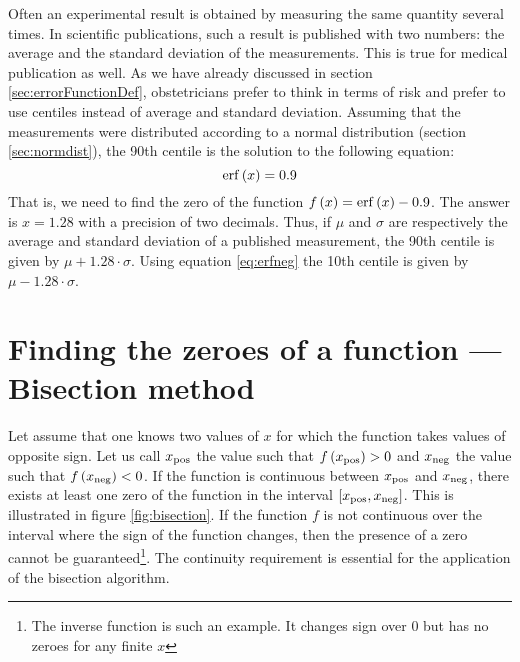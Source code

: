 \documentclass[twoside]{book}
\begin{document}
Often an experimental result is obtained by measuring the same
quantity several times. In scientific publications, such a result
is published with two numbers: the average and the standard
deviation of the measurements. This is true for medical
publication as well. As we have already discussed in section
\ref{sec:errorFunctionDef}, obstetricians prefer to think in terms
of risk and prefer to use centiles instead of average and standard
deviation. Assuming that the measurements were distributed
according to a normal distribution (\cf section
\ref{sec:normdist}), the 90th centile is the solution to the
following equation:
\begin{equation}
\label{eq:centile90}
  \mathop{\rm erf}\left(x\right)=0.9
\end{equation}
That is, we need to find the zero of the function
$f\left(x\right)=\mathop{\rm erf}\left(x\right)-0.9$. The answer is $x=1.28$
with a precision of two decimals. Thus, if $\mu$ and $\sigma$ are
respectively the average and standard deviation of a published
measurement, the 90th centile is given by $\mu+1.28\cdot\sigma$.
Using equation \ref{eq:erfneg} the 10th centile is given by
$\mu-1.28\cdot\sigma$.

\section{Finding the zeroes of a function --- Bisection method}
\label{sec:bisection} Let assume that one
knows two values of $x$ for which the function takes values of
opposite sign. Let us call $x_{\mathop{\rm pos}}$ the value such
that $f\left(x_{\mathop{\rm pos}}\right)>0$ and $x_{\mathop{\rm
neg}}$ the value such that $f\left(x_{\mathop{\rm neg}}\right)<0$.
If the function is continuous between $x_{\mathop{\rm pos}}$ and
$x_{\mathop{\rm neg}}$, there exists at least one zero of the
function in the interval $\left[ x_{\mathop{\rm
pos}},x_{\mathop{\rm neg}}\right]$. This is illustrated in figure
\ref{fig:bisection}. If the function $f$ is not continuous over
the interval where the sign of the function changes, then the
presence of a zero cannot be guaranteed\footnote{The inverse
function is such an example. It changes sign over 0 but has no
zeroes for any finite $x$}. The continuity requirement is
essential for the application of the bisection algorithm.
\end{document}
